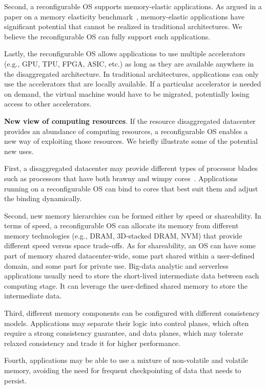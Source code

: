 Second, a reconfigurable OS supports memory-elastic applications.
As argued in a paper on a memory elasticity
benchmark~\cite{funaro2020memory}, memory-elastic applications have
significant potential that cannot be realized in traditional
architectures.  We believe the reconfigurable OS can fully support
such applications.

Lastly, the reconfigurable OS allows applications to use multiple
accelerators (e.g., GPU, TPU, FPGA, ASIC, etc.) as long as they are
available anywhere in the disaggregated architecture.
In traditional architectures, applications can only use the
accelerators that are locally available.  If a particular accelerator
is needed on demand, the virtual machine would have to be migrated,
potentially losing access to other accelerators.

\noindent
\textbf{New view of computing resources}.
If the resource disaggregated datacenter provides an abundance of
computing resources, a reconfigurable OS enables a new way
of exploiting those resources. We briefly illustrate some of the
potential new uses.

First, a disaggregated datacenter may provide different types of
processor blades such as processors that have both brawny and
wimpy cores~\cite{holzle2010brawny}. Applications running on a
reconfigurable OS can bind to cores that best suit them and adjust
the binding dynamically.

Second, new memory hierarchies can be formed either by speed or
shareability. In terms of speed, a reconfigurable OS can allocate
its memory from different memory technologies (e.g., DRAM, 3D-stacked
DRAM, NVM) that provide different speed versus space trade-offs. As for
shareability, an OS can have some part of memory shared
datacenter-wide, some part shared within a user-defined domain,
and some part for private use. Big-data analytic and serverless
applications usually need to store the short-lived intermediate
data between each computing stage. It can leverage the user-defined
shared memory to store the intermediate data.

Third, different memory components can be configured with different
consistency models. Applications may separate their logic into
control planes, which often require a strong consistency guarantee,
and data planes, which may tolerate relaxed consistency and trade
it for higher performance.

Fourth, applications may be able to use a mixture of non-volatile
and volatile memory, avoiding the need for frequent checkpointing
of data that needs to persist.

